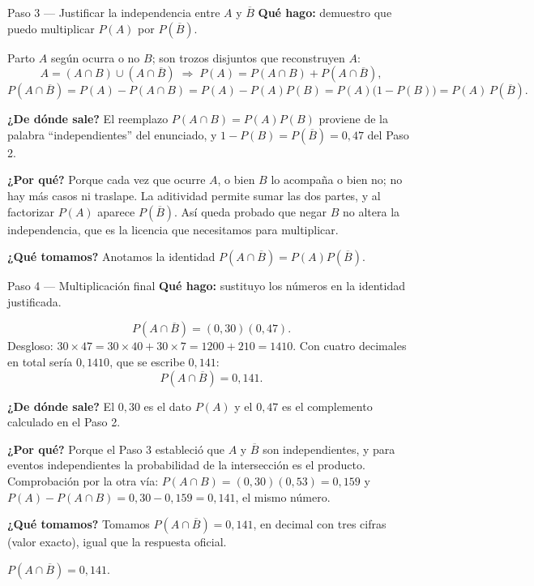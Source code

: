 \documentclass[11pt]{article}
\begin{document}
\begin{paso}{Paso 3 --- Justificar la independencia entre $A$ y $\overline{B}$}
\textbf{Qué hago:} demuestro que puedo multiplicar $P(A)$ por $P(\overline{B})$.

Parto $A$ según ocurra o no $B$; son trozos disjuntos que reconstruyen $A$:
\[
A=(A\cap B)\cup(A\cap\overline{B})
\;\Longrightarrow\;
P(A)=P(A\cap B)+P(A\cap\overline{B}),
\]
\[
P(A\cap\overline{B})=P(A)-P(A\cap B)=P(A)-P(A)P(B)=P(A)\bigl(1-P(B)\bigr)=P(A)\,P(\overline{B}).
\]

\textbf{¿De dónde sale?} El reemplazo $P(A\cap B)=P(A)P(B)$ proviene de la palabra ``independientes'' del enunciado, y $1-P(B)=P(\overline{B})=0{,}47$ del Paso 2.

\textbf{¿Por qué?} Porque cada vez que ocurre $A$, o bien $B$ lo acompaña o bien no; no hay más casos ni traslape. La aditividad permite sumar las dos partes, y al factorizar $P(A)$ aparece $P(\overline{B})$. Así queda probado que negar $B$ no altera la independencia, que es la licencia que necesitamos para multiplicar.

\textbf{¿Qué tomamos?} Anotamos la identidad $P(A\cap\overline{B})=P(A)P(\overline{B})$.
\end{paso}

\begin{paso}{Paso 4 --- Multiplicación final}
\textbf{Qué hago:} sustituyo los números en la identidad justificada.

\[
P(A\cap\overline{B})=(0{,}30)(0{,}47).
\]
Desgloso: $30\times 47=30\times 40+30\times 7=1200+210=1410$. Con cuatro decimales en total sería $0{,}1410$, que se escribe $0{,}141$:
\[
P(A\cap\overline{B})=0{,}141.
\]

\textbf{¿De dónde sale?} El $0{,}30$ es el dato $P(A)$ y el $0{,}47$ es el complemento calculado en el Paso 2.

\textbf{¿Por qué?} Porque el Paso 3 estableció que $A$ y $\overline{B}$ son independientes, y para eventos independientes la probabilidad de la intersección es el producto. Comprobación por la otra vía: $P(A\cap B)=(0{,}30)(0{,}53)=0{,}159$ y $P(A)-P(A\cap B)=0{,}30-0{,}159=0{,}141$, el mismo número.

\textbf{¿Qué tomamos?} Tomamos $P(A\cap\overline{B})=0{,}141$, en decimal con tres cifras (valor exacto), igual que la respuesta oficial.
\end{paso}

\begin{resp}
$P(A\cap\overline{B})=0{,}141$.
\end{resp}
\end{document}
